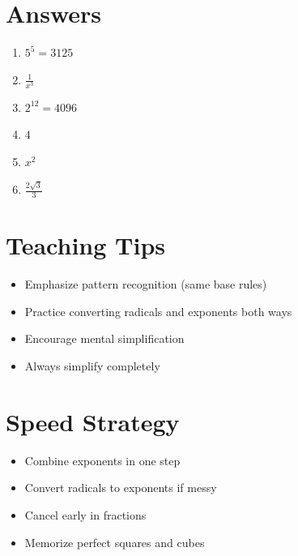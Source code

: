 \section*{Answers}
\begin{enumerate}
    \item $5^5 = 3125$
    \item $\frac{1}{x^3}$
    \item $2^{12} = 4096$
    \item $4$
    \item $x^2$
    \item $\frac{2\sqrt{3}}{3}$
\end{enumerate}

\section*{Teaching Tips}
\begin{itemize}
    \item Emphasize pattern recognition (same base rules)
    \item Practice converting radicals and exponents both ways
    \item Encourage mental simplification
    \item Always simplify completely
\end{itemize}

\section*{Speed Strategy}
\begin{itemize}
    \item Combine exponents in one step
    \item Convert radicals to exponents if messy
    \item Cancel early in fractions
    \item Memorize perfect squares and cubes
\end{itemize}
